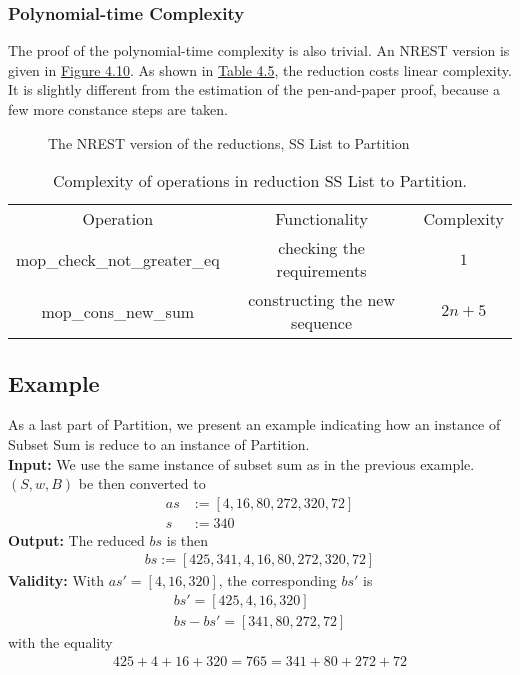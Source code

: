 \subsubsection{Polynomial-time Complexity}
The proof of the polynomial-time complexity is also trivial. 
An NREST version is given in \hyperref[fig:4.10]{Figure 4.10}. 
As shown in \hyperref[table:4.5]{Table 4.5}, the reduction costs linear complexity. It is slightly 
different from the estimation of the pen-and-paper proof, because a few more constance steps are taken. 
\begin{figure}[!h]
    \caption{The NREST version of the reductions, SS List to Partition}
    \label{fig:4.10}
\end{figure}
\begin{table}[!h]
    \centering 
    \begin{tabular}{| c | c | c |}
        \hline 
        Operation & Functionality & Complexity \\ 
        \hhline{|=|=|=|}
        mop\_check\_not\_greater\_eq & checking the requirements & $1$ \\ 
        \hline 
        mop\_cons\_new\_sum & constructing the new sequence & $2n + 5$ \\ 
        \hline 
    \end{tabular}
    \caption{Complexity of operations in reduction SS List to Partition.}
    \label{table:4.5}
\end{table}

\subsection{Example}
As a last part of Partition, we present an example indicating how an instance of Subset Sum 
is reduce to an instance of Partition.\\
\textbf{Input:} We use the same instance of subset sum as in the previous example. $(S, w, B)$ be 
then converted to 
\begin{align*}
    as &:= [4, 16, 80, 272, 320, 72] \\ 
    s &:= 340
\end{align*}
\textbf{Output:} The reduced $bs$ is then 
\begin{align*}
    bs := [425, 341, 4, 16, 80, 272, 320, 72]
\end{align*}
\textbf{Validity:} With $as' = [4, 16, 320]$, the corresponding $bs'$ is 
\begin{align*}
    bs' = [425, 4, 16, 320] \\ 
    bs - bs' = [341, 80, 272, 72]
\end{align*}
with the equality
\begin{align*}
    425 + 4 + 16 + 320 = 765 = 341 + 80 + 272 + 72 
\end{align*}

